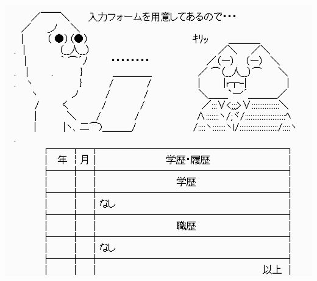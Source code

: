 \begin{reviewimage}[H]%
\includegraphics[width=0.6\maxwidth]{./images/03-todo-with-react/form.png}%
\label{image:03-todo-with-react:form}
\end{reviewimage}
